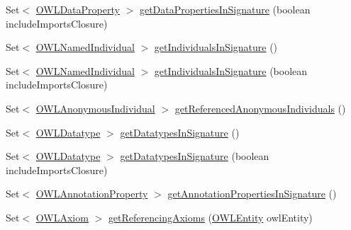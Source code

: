 \begin{DoxyCompactItemize}
\item 
Set$<$ \hyperlink{interfaceorg_1_1semanticweb_1_1owlapi_1_1model_1_1_o_w_l_data_property}{O\-W\-L\-Data\-Property} $>$ \hyperlink{interfaceorg_1_1semanticweb_1_1owlapi_1_1model_1_1_o_w_l_ontology_ab67c6b9780e0c08cd33ba4fef973081a}{get\-Data\-Properties\-In\-Signature} (boolean include\-Imports\-Closure)
\item 
Set$<$ \hyperlink{interfaceorg_1_1semanticweb_1_1owlapi_1_1model_1_1_o_w_l_named_individual}{O\-W\-L\-Named\-Individual} $>$ \hyperlink{interfaceorg_1_1semanticweb_1_1owlapi_1_1model_1_1_o_w_l_ontology_ac5c78ec9f939f01cc509fba8396177d6}{get\-Individuals\-In\-Signature} ()
\item 
Set$<$ \hyperlink{interfaceorg_1_1semanticweb_1_1owlapi_1_1model_1_1_o_w_l_named_individual}{O\-W\-L\-Named\-Individual} $>$ \hyperlink{interfaceorg_1_1semanticweb_1_1owlapi_1_1model_1_1_o_w_l_ontology_a0deb735d540c383d5273f1fb47dc3065}{get\-Individuals\-In\-Signature} (boolean include\-Imports\-Closure)
\item 
Set$<$ \hyperlink{interfaceorg_1_1semanticweb_1_1owlapi_1_1model_1_1_o_w_l_anonymous_individual}{O\-W\-L\-Anonymous\-Individual} $>$ \hyperlink{interfaceorg_1_1semanticweb_1_1owlapi_1_1model_1_1_o_w_l_ontology_a806d9c23e59234e4f12b14b6d391510f}{get\-Referenced\-Anonymous\-Individuals} ()
\item 
Set$<$ \hyperlink{interfaceorg_1_1semanticweb_1_1owlapi_1_1model_1_1_o_w_l_datatype}{O\-W\-L\-Datatype} $>$ \hyperlink{interfaceorg_1_1semanticweb_1_1owlapi_1_1model_1_1_o_w_l_ontology_ad580156be1bfc8ef58e1b42c5e28013a}{get\-Datatypes\-In\-Signature} ()
\item 
Set$<$ \hyperlink{interfaceorg_1_1semanticweb_1_1owlapi_1_1model_1_1_o_w_l_datatype}{O\-W\-L\-Datatype} $>$ \hyperlink{interfaceorg_1_1semanticweb_1_1owlapi_1_1model_1_1_o_w_l_ontology_a4bee44359a4a6410c14c3bc9aca44b94}{get\-Datatypes\-In\-Signature} (boolean include\-Imports\-Closure)
\item 
Set$<$ \hyperlink{interfaceorg_1_1semanticweb_1_1owlapi_1_1model_1_1_o_w_l_annotation_property}{O\-W\-L\-Annotation\-Property} $>$ \hyperlink{interfaceorg_1_1semanticweb_1_1owlapi_1_1model_1_1_o_w_l_ontology_ac73b8f00659d2b3622e94e3f4778b8bd}{get\-Annotation\-Properties\-In\-Signature} ()
\item 
Set$<$ \hyperlink{interfaceorg_1_1semanticweb_1_1owlapi_1_1model_1_1_o_w_l_axiom}{O\-W\-L\-Axiom} $>$ \hyperlink{interfaceorg_1_1semanticweb_1_1owlapi_1_1model_1_1_o_w_l_ontology_a4d99a9d0e1ce1523f099713bfdcf4b28}{get\-Referencing\-Axioms} (\hyperlink{interfaceorg_1_1semanticweb_1_1owlapi_1_1model_1_1_o_w_l_entity}{O\-W\-L\-Entity} owl\-Entity)

\end{DoxyCompactItemize}
